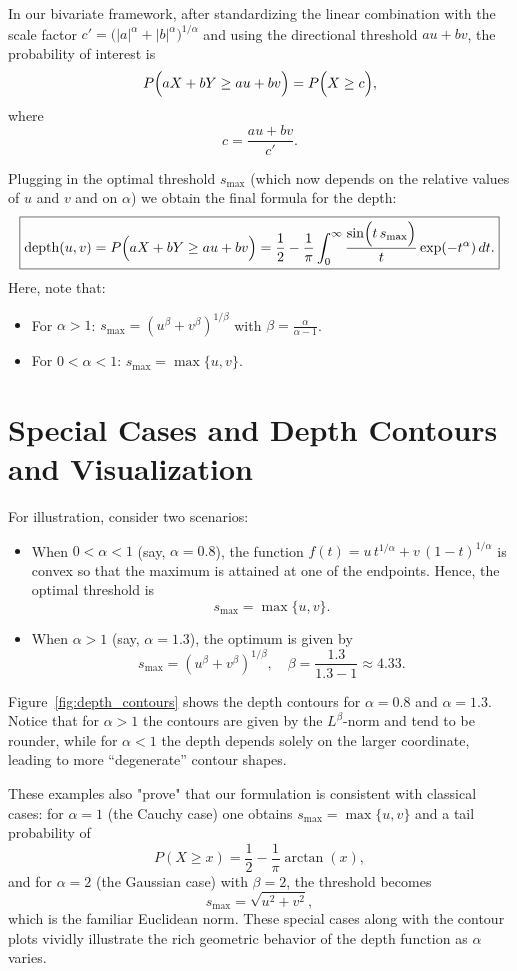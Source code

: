 In our bivariate framework, after standardizing the linear combination with the scale factor \(c'=\bigl(|a|^\alpha+|b|^\alpha\bigr)^{1/\alpha}\) and using the directional threshold \(au+bv\), the probability of interest is
\[
P\Bigl(aX+bY\ge au+bv\Bigr)= P\Bigl(X\ge c\Bigr),
\]
where
\[
c=\frac{au+bv}{c'}.
\]

Plugging in the optimal threshold \(s_{\max}\) (which now depends on the relative values of \(u\) and \(v\) and on \(\alpha\)) we obtain the final formula for the depth:
\[
\boxed{
\operatorname{depth}(u,v)= P\Bigl(aX+bY\ge au+bv\Bigr)= \frac{1}{2}-\frac{1}{\pi}\int_0^{\infty}\frac{\sin\Bigl(t\,s_{\max}\Bigr)}{t}\exp(-t^\alpha)\,dt.
}
\]
Here, note that:
\begin{itemize}
  \item For \(\alpha>1\): \(s_{\max}=\left(u^\beta+v^\beta\right)^{1/\beta}\) with \(\beta=\frac{\alpha}{\alpha-1}\).
  \item For \(0<\alpha<1\): \(s_{\max}=\max\{u,v\}\).
\end{itemize}

\section{Special Cases and Depth Contours and Visualization}

For illustration, consider two scenarios:
\begin{itemize}
  \item When \(0<\alpha<1\) (say, \(\alpha=0.8\)), the function \(f(t)= u\,t^{1/\alpha}+v\,(1-t)^{1/\alpha}\) is convex so that the maximum is attained at one of the endpoints. Hence, the optimal threshold is
  \[
  s_{\max} = \max\{u,v\}.
  \]
  \item When \(\alpha>1\) (say, \(\alpha=1.3\)), the optimum is given by
  \[
  s_{\max} = \left(u^\beta+v^\beta\right)^{1/\beta},\quad \beta=\frac{1.3}{1.3-1}\approx 4.33.
  \]
\end{itemize}

Figure~\ref{fig:depth_contours} shows the depth contours for \(\alpha=0.8\) and \(\alpha=1.3\). Notice that for \(\alpha>1\) the contours are given by the \(L^\beta\)-norm and tend to be rounder, while for \(\alpha<1\) the depth depends solely on the larger coordinate, leading to more “degenerate” contour shapes.

These examples also "prove" that our formulation is consistent with classical cases: for \(\alpha=1\) (the Cauchy case) one obtains \(s_{\max}=\max\{u,v\}\) and a tail probability of
\[
P(X \ge x)=\frac{1}{2}-\frac{1}{\pi}\arctan(x),
\]
and for \(\alpha=2\) (the Gaussian case) with \(\beta=2\), the threshold becomes
\[
s_{\max}=\sqrt{u^2+v^2},
\]
which is the familiar Euclidean norm. These special cases along with the contour plots vividly illustrate the rich geometric behavior of the depth function as \(\alpha\) varies.

